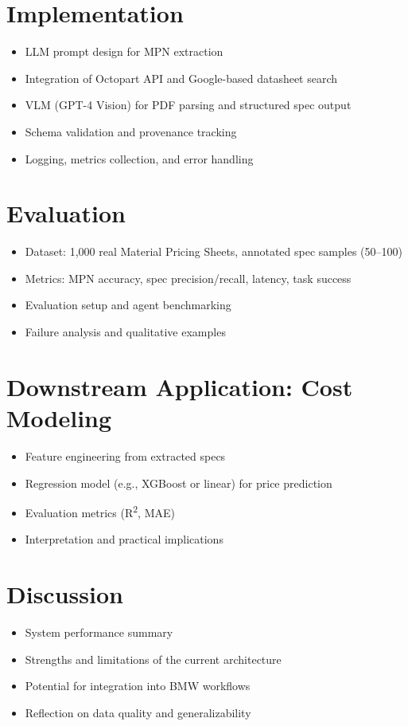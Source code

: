 \documentclass[11pt]{article}
\begin{document}
\section{Implementation}
\begin{itemize}
  \item LLM prompt design for MPN extraction
  \item Integration of Octopart API and Google-based datasheet search
  \item VLM (GPT-4 Vision) for PDF parsing and structured spec output
  \item Schema validation and provenance tracking
  \item Logging, metrics collection, and error handling
\end{itemize}

\section{Evaluation}
\begin{itemize}
  \item Dataset: 1,000 real Material Pricing Sheets, annotated spec samples (50--100)
  \item Metrics: MPN accuracy, spec precision/recall, latency, task success
  \item Evaluation setup and agent benchmarking
  \item Failure analysis and qualitative examples
\end{itemize}

\section{Downstream Application: Cost Modeling}
\begin{itemize}
  \item Feature engineering from extracted specs
  \item Regression model (e.g., XGBoost or linear) for price prediction
  \item Evaluation metrics (R\textsuperscript{2}, MAE)
  \item Interpretation and practical implications
\end{itemize}

\section{Discussion}
\begin{itemize}
  \item System performance summary
  \item Strengths and limitations of the current architecture
  \item Potential for integration into BMW workflows
  \item Reflection on data quality and generalizability
\end{itemize}
\end{document}
